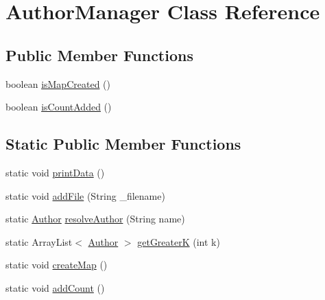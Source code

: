 \hypertarget{classAuthorManager}{}\section{Author\+Manager Class Reference}
\label{classAuthorManager}
\subsection*{Public Member Functions}
\begin{DoxyCompactItemize}
\item 
boolean \hyperlink{classAuthorManager_a5cb4134008bb414c37149602662769d8}{is\+Map\+Created} ()
\item 
boolean \hyperlink{classAuthorManager_ad983b61aa9ddd96c8ba87a334aa5cc53}{is\+Count\+Added} ()
\end{DoxyCompactItemize}
\subsection*{Static Public Member Functions}
\begin{DoxyCompactItemize}
\item 
static void \hyperlink{classAuthorManager_ae490d0dc2f66dacae33a7ab1145c99d8}{print\+Data} ()
\item 
static void \hyperlink{classAuthorManager_a2fd95ddd7a1565f7665a7d961b445788}{add\+File} (String \+\_\+filename)
\item 
static \hyperlink{classAuthor}{Author} \hyperlink{classAuthorManager_a2442f65701e05d1c2f9f7edb473cb0f3}{resolve\+Author} (String name)
\item 
static Array\+List$<$ \hyperlink{classAuthor}{Author} $>$ \hyperlink{classAuthorManager_a7aa5758d30203dc5f31f19154a15ec82}{get\+GreaterK} (int k)
\item 
static void \hyperlink{classAuthorManager_ac6244bdca3be32f6037f5c045c69f6f5}{create\+Map} ()
\item 
static void \hyperlink{classAuthorManager_a046c775056c501681d92dbfcf4a9bbf2}{add\+Count} ()
\end{DoxyCompactItemize}

